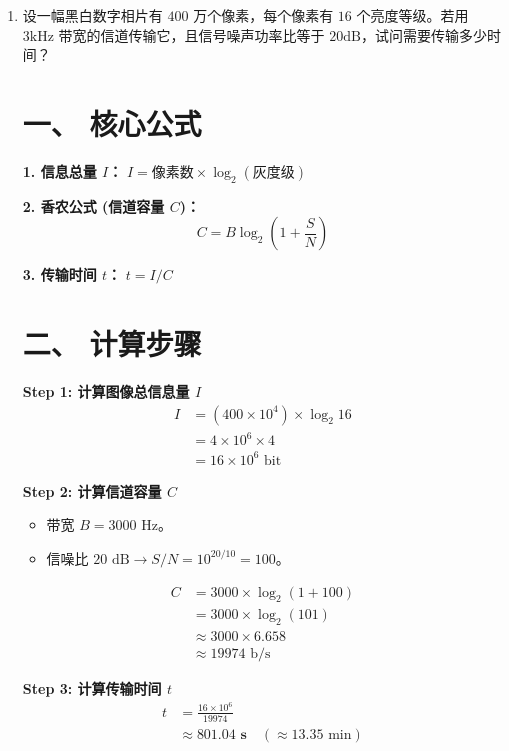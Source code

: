 \documentclass[a4paper,11pt]{ctexart}
\begin{document}
\begin{enumerate}[label=\textbf{4-\arabic*}]
    \item 设一幅黑白数字相片有 $400$ 万个像素，每个像素有 $16$ 个亮度等级。若用 $3\text{kHz}$ 带宽的信道传输它，且信号噪声功率比等于 $20\text{dB}$，试问需要传输多少时间？
    \begin{tcolorbox}[colback=white, colframe=blue!50!black, title=\textbf{题目解答：4-9 图像传输时间计算}]

        \section*{一、 核心公式}
        
        \textbf{1. 信息总量 $I$：} $I = \text{像素数} \times \log_2(\text{灰度级})$
        
        \textbf{2. 香农公式 (信道容量 $C$)：}
        \begin{equation}
            C = B \log_2\left(1 + \frac{S}{N}\right)
        \end{equation}
        
        \textbf{3. 传输时间 $t$：} $t = I / C$

        \end{tcolorbox}

        \section*{二、 计算步骤}
        
        \textbf{Step 1: 计算图像总信息量 $I$}
        \begin{align*}
            I &= (400 \times 10^4) \times \log_2 16 \\
            &= 4 \times 10^6 \times 4 \\
            &= 16 \times 10^6 \text{ bit}
        \end{align*}

        \textbf{Step 2: 计算信道容量 $C$}
        \begin{itemize}
            \item 带宽 $B = 3000 \text{ Hz}$。
            \item 信噪比 $20 \text{ dB} \rightarrow S/N = 10^{20/10} = 100$。
        \end{itemize}
        \begin{align*}
            C &= 3000 \times \log_2(1 + 100) \\
            &= 3000 \times \log_2(101) \\
            &\approx 3000 \times 6.658 \\
            &\approx 19974 \text{ b/s}
        \end{align*}

        \textbf{Step 3: 计算传输时间 $t$}
        \begin{align*}
            t &= \frac{16 \times 10^6}{19974} \\
            &\approx \mathbf{801.04 \text{ s}} \quad (\approx 13.35 \text{ min})
        \end{align*}

\end{enumerate}
\end{document}
